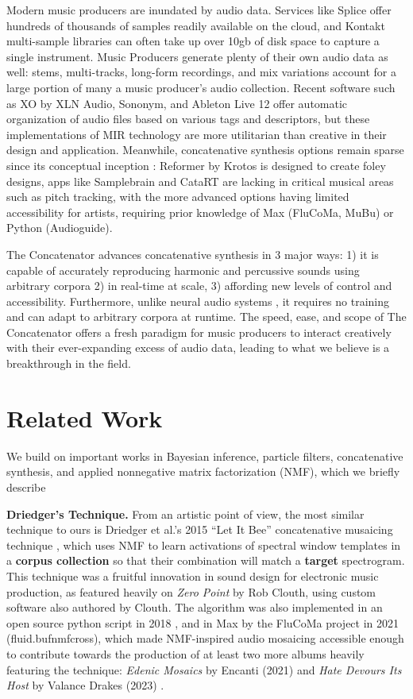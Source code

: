 \documentclass{article}
\begin{document}
Modern music producers are inundated by audio data. Services like Splice offer hundreds of thousands of samples readily available on the cloud, and Kontakt multi-sample libraries can often take up over 10gb of disk space to capture a single instrument. Music Producers generate plenty of their own audio data as well: stems, multi-tracks, long-form recordings, and mix variations account for a large portion of many a music producer's audio collection. Recent software such as XO by XLN Audio, Sononym, and Ableton Live 12 offer automatic organization of audio files based on various tags and descriptors, but these implementations of MIR technology are more utilitarian than creative in their design and application. Meanwhile, concatenative synthesis options remain sparse since its conceptual inception \cite{schwarz2000system}: Reformer by Krotos is designed to create foley designs, apps like Samplebrain and CataRT \cite{schwarz2006real, schwarz2008principles} are lacking in critical musical areas such as pitch tracking, with the more advanced options having limited accessibility for artists, requiring prior knowledge of Max (FluCoMa, MuBu) or Python (Audioguide).

The Concatenator advances concatenative synthesis in 3 major ways: 1) it is capable of accurately reproducing harmonic and percussive sounds using arbitrary corpora 2) in real-time at scale, 3) affording new levels of control and accessibility.  Furthermore, unlike neural audio systems \cite{bitton2020neural}, it requires no training and can adapt to arbitrary corpora at runtime. The speed, ease, and scope of The Concatenator offers a fresh paradigm for music producers to interact creatively with their ever-expanding excess of audio data, leading to what we believe is a breakthrough in the field.

\section{Related Work}
\label{sec:relatedwork}
We build on important works in Bayesian inference, particle filters, concatenative synthesis, and applied nonnegative matrix factorization (NMF), which we briefly describe

\textbf{Driedger's Technique.} From an artistic point of view, the most similar technique to ours is Driedger et al.'s 2015 ``Let It Bee'' concatenative musaicing technique \cite{driedger2015let}, which uses NMF to learn activations of spectral window templates in a \textbf{corpus collection} so that their combination will match a \textbf{target} spectrogram. This technique was a fruitful innovation in sound design for electronic music production, as featured heavily on {\em Zero Point} by Rob Clouth\cite{clouth2020}, using custom software also authored by Clouth. The algorithm was also implemented in an open source python script in 2018 \cite{tralie2018}, and in Max by the FluCoMa project in 2021 (fluid.bufnmfcross)\cite{flucoma2021}, which made NMF-inspired audio mosaicing accessible enough to contribute towards the production of at least two more albums heavily featuring the technique: {\em Edenic Mosaics} by Encanti (2021) \cite{cantil2021} and {\em Hate Devours Its Host} by Valance Drakes (2023) \cite{drakes2023}.
\end{document}
